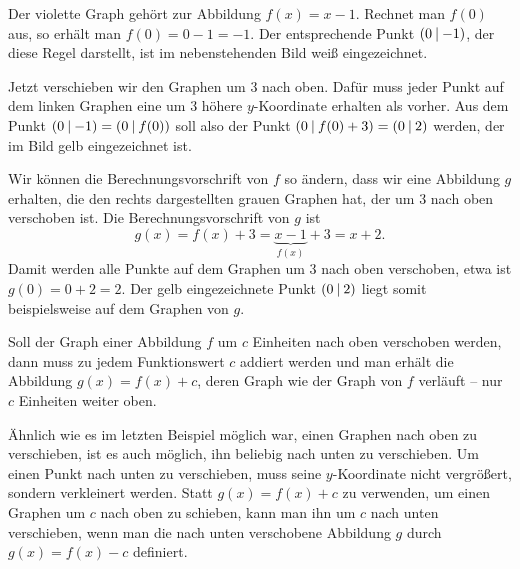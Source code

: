 \documentclass[../../main.tex]{subfiles}
\begin{document}
\begin{example}{}
    Der violette Graph gehört zur Abbildung \mbox{$f(x)=x-1$}. Rechnet man $f(0)$ aus, so erhält man \mbox{$f(0)=0-1=-1$}. Der entsprechende Punkt $\left(0 \:\middle|\: -1\right)$, der diese Regel darstellt, ist im nebenstehenden Bild weiß eingezeichnet.
    
    Jetzt verschieben wir den Graphen um $3$ nach oben. Dafür muss jeder Punkt auf dem linken Graphen eine um $3$ höhere $y$-Koordinate erhalten als vorher. Aus dem Punkt $\left(0 \:\middle|\: -1\right)=\left(0 \:\middle|\: f(0)\right)$ soll also der Punkt $\left(0 \:\middle|\: f(0)+3\right)=\left(0 \:\middle|\: 2\right)$ werden, der im Bild gelb eingezeichnet ist.
    
    Wir können die Berechnungsvorschrift von $f$ so ändern, dass wir eine Abbildung $g$ erhalten, die den rechts dargestellten grauen Graphen hat, der um $3$ nach oben verschoben ist. Die Berechnungsvorschrift von $g$ ist \[g(x)=f(x)+3=\underbrace{x-1}_{f(x)}+3=x+2.\] 
    Damit werden alle Punkte auf dem Graphen um $3$ nach oben verschoben, etwa ist $g(0)=0+2=2$. Der gelb eingezeichnete Punkt $\left(0 \:\middle|\: 2\right)$ liegt somit beispielsweise auf dem Graphen von $g$.
\end{example}

\sloppy
Soll der Graph einer Abbildung $f$ um $c$ Einheiten nach oben verschoben werden, dann muss zu jedem Funktionswert $c$ addiert werden und man erhält die Abbildung \mbox{$g(x)=f(x)+c$}, deren Graph wie der Graph von $f$ verläuft -- nur $c$ Einheiten weiter oben.

\fussy
Ähnlich wie es im letzten Beispiel möglich war, einen Graphen nach oben zu verschieben, ist es auch möglich, ihn beliebig nach unten zu verschieben. Um einen Punkt nach unten zu verschieben, muss seine $y$-Koordinate nicht vergrößert, sondern verkleinert werden. Statt $g(x)=f(x)+c$ zu verwenden, um einen Graphen um $c$ nach oben zu schieben, kann man ihn um $c$ nach unten verschieben, wenn man die nach unten verschobene Abbildung $g$ durch $g(x)=f(x)-c$ definiert.
\end{document}
